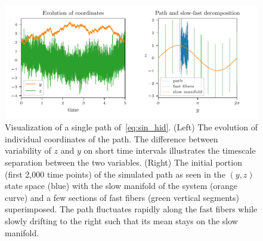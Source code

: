 \documentclass{article}
\begin{document}
\begin{figure}
    \centering
    \includegraphics[draft=false,width=\textwidth]{figs/sin2d_paths_hidden.pdf}
    \caption{Visualization of a single path of~\eqref{eq:sin_hid}. (Left) The evolution of individual coordinates of the path. The difference between variability of $z$ and $y$ on short time intervals illustrates the timescale separation between the two variables. (Right) The initial portion (first 2,000 time points) of the simulated path as seen in the $(y,z)$ state space (blue) with the slow manifold of the system (orange curve) and a few sections of fast fibers (green vertical segments) superimposed. The path fluctuates rapidly along the fast fibers while slowly drifting to the right such that its mean stays on the slow manifold.}
    \label{fig:sin2d_pat_hid}
\end{figure}
\end{document}
